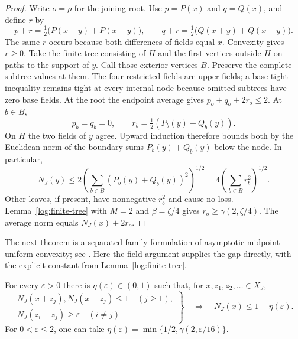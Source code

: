 \begin{proof}
Write $o=\rho$ for the joining root.  Use $p=P(x)$ and $q=Q(x)$,
and define $r$ by
\[
 p+r=\tfrac12\bigl(P(x+y)+P(x-y)\bigr),\qquad
 q+r=\tfrac12\bigl(Q(x+y)+Q(x-y)\bigr).
\]
The same $r$ occurs because both differences of fields equal $x$.
Convexity gives $r\ge0$.  Take the finite tree consisting of $H$ and
the first vertices outside $H$ on paths to the support of $y$.
Call those exterior vertices $B$.  Preserve the complete subtree
values at them.  The four restricted fields are upper fields; a
base tight inequality remains tight at every internal node because
omitted subtrees have zero base fields.  At the root the endpoint
average gives $p_o+q_o+2r_o\le2$.  At $b\in B$,
\[
 p_b=q_b=0,\qquad r_b=\tfrac12(P_b(y)+Q_b(y)).
\]
On $H$ the two fields of $y$ agree.  Upward induction therefore
bounds both by the Euclidean norm of the boundary sums
$P_b(y)+Q_b(y)$ below the node.  In particular,
\[
 N_J(y)\le2\left(\sum_{b\in B}(P_b(y)+Q_b(y))^2\right)^{1/2}
          =4\left(\sum_{b\in B}r_b^2\right)^{1/2}.
\]
Other leaves, if present, have nonnegative $r_b^2$ and cause no loss.
Lemma~\ref{log:finite-tree} with $M=2$ and $\beta=\zeta/4$ gives
$r_o\ge\gamma(2,\zeta/4)$.  The average norm equals $N_J(x)+2r_o$.
\end{proof}

The next theorem is a separated-family formulation of asymptotic
midpoint uniform convexity; see
\citet[Definition~6.15 and Proposition~6.16]{BLP2026}.
Here the field argument supplies the gap directly, with the explicit
constant from Lemma~\ref{log:finite-tree}.

\begin{theorem}\label{log:lens-gap}
For every $\varepsilon>0$ there is $\eta(\varepsilon)\in(0,1)$ such
that, for $x,z_1,z_2,\ldots\in X_J$,
\[
 \left.
 \begin{gathered}
 N_J(x+z_j),N_J(x-z_j)\le1\quad(j\ge1),\\
 N_J(z_i-z_j)\ge\varepsilon\quad(i\ne j)
 \end{gathered}
 \right\}
 \quad\Longrightarrow\quad N_J(x)\le1-\eta(\varepsilon).
\]
For $0<\varepsilon\le2$, one can take
$\eta(\varepsilon)=\min\{1/2,\gamma(2,\varepsilon/16)\}$.
\end{theorem}

